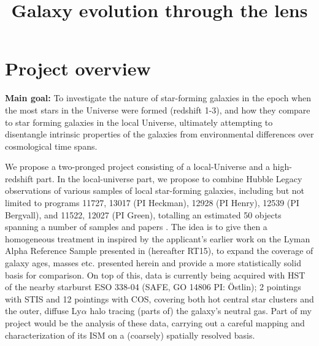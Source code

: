 \documentclass[10pt, letterpaper, headings=Large, DIV=14]{scrartcl}
\title{Galaxy evolution through the lens}  %
\date{}                                           %
\begin{document}
{}

% 

\section*{Project overview}

{\bfseries \sffamily Main goal:} To investigate the nature of star-forming
galaxies in the epoch when the most stars in the Universe were formed (redshift
1-3), and how they compare to star forming galaxies in the local Universe,
ultimately attempting to disentangle intrinsic properties of the galaxies from
environmental differences over cosmological time spans. \newline

 We propose a two-pronged project
consisting of a local-Universe and a high-redshift part. In the local-universe
part, we propose to combine Hubble Legacy observations of various samples of
local star-forming galaxies, including but not limited to programs 11727, 13017
(PI Heckman), 12928 (PI Henry), 12539 (PI Bergvall), and 11522, 12027 (PI
Green), totalling an estimated 50 objects spanning a number of samples and
papers \citep[e.g.][]{Wofford2013,Alexandroff2015,Heckman2015,Henry2015}. The
idea is to give then a homogeneous treatment in inspired by the applicant's
earlier work on the Lyman Alpha Reference Sample \citep[LARS, ][]{LARSI,LARSII}
presented in \cite{RiveraThorsen2015} (hereafter RT15), to expand the coverage
of galaxy ages, masses etc. presented herein and provide a more statistically
solid basis for comparison. On top of this, data is currently being acquired
with HST of the nearby starburst ESO 338-04 (SAFE, GO 14806 PI: Östlin); 2
pointings with STIS and 12 pointings with COS, covering both hot central star
clusters and the outer, diffuse Ly$\alpha$ halo tracing (parts of) the galaxy's
neutral gas. Part of my project would be the analysis of these data, carrying
out a careful mapping and characterization of its ISM on a (coarsely) spatially
resolved basis.  
\end{document}
